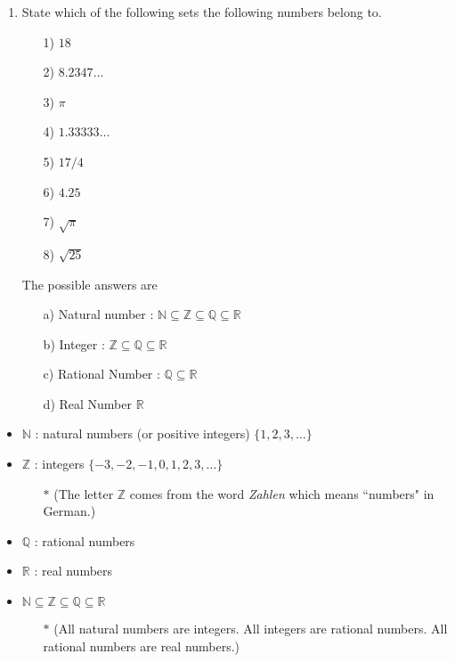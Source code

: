 \documentclass[]{report}
\begin{document}
\begin{enumerate}
\item State which of the following sets the following numbers belong to. 
\begin{multicols}{4}
\begin{itemize}
\item[1)] $18$
\item[2)] $8.2347\ldots$
\item[3)] $\pi$
\item[4)] $1.33333\ldots$
\item[5)] $17/4$
\item[6)] $4.25$
\item[7)] $\sqrt{\pi}$
\item[8)] $\sqrt{25}$
\end{itemize}
\end{multicols}
\bigskip
The possible answers are

\begin{itemize}
\item[a)] Natural number : $\mathbb{N} \subseteq \mathbb{Z } \subseteq \mathbb{Q} \subseteq \mathbb{R}$
\item[b)] Integer : $ \mathbb{Z } \subseteq \mathbb{Q} \subseteq \mathbb{R}$
\item[c)] Rational Number : $ \mathbb{Q} \subseteq \mathbb{R}$
\item[d)] Real Number $\mathbb{R}$
\end{itemize}

\end{enumerate}

\begin{itemize}
\item $\mathbb{N}$ : natural numbers (or positive integers) $\{1,2,3,\ldots\}$
\item $\mathbb{Z}$ : integers $\{-3,-2,-1,0,1,2,3,\ldots\}$
\begin{itemize}
\item[$\ast$] (The letter $\mathbb{Z}$ comes from the word \emph{Zahlen} which means ``numbers" in German.)
\end{itemize}
\item $\mathbb{Q}$ : rational numbers
\item $\mathbb{R}$ : real numbers
\item $\mathbb{N} \subseteq \mathbb{Z } \subseteq \mathbb{Q} \subseteq \mathbb{R}$
\begin{itemize}
\item[$\ast$] (All natural numbers are integers. All integers are rational numbers. All rational numbers are real numbers.)
\end{itemize}
\end{itemize}
\end{document}
